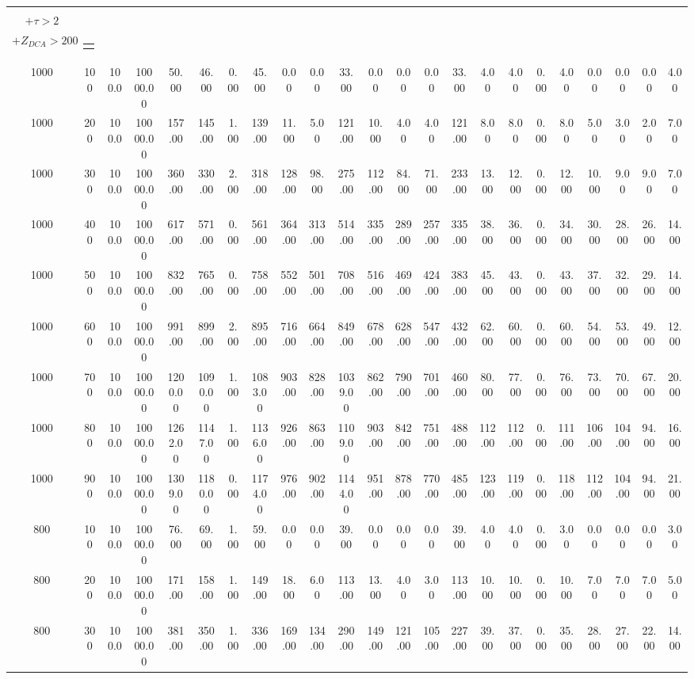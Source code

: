 \documentclass[8pt]{extarticle}
\begin{document}
\begin{longtable}{|c|c|c|c|c|c|c|c|c|c|c|c|c|c|c|c|c|c|c|c|c|c|c|}
\begin{tabular}{@{}c@{}} $E_T^{miss} > 75$ \\ $+ \tau > 2$ \\ $+Z_{DCA} > 200$\end{tabular} & \begin{tabular}{@{}c@{}} $E_{T}^{miss} > 75$ $+ \tau < 4$ \end{tabular} \\ 
\hline 
1000&100&100.0&10000.00&50.00&46.00&0.00&45.00&0.00&0.00&33.00&0.00&0.00&0.00&33.00&4.00&4.00&0.00&4.00&0.00&0.00&0.00&4.00\\ 
\hline 
1000&200&100.0&10000.00&157.00&145.00&1.00&139.00&11.00&5.00&121.00&10.00&4.00&4.00&121.00&8.00&8.00&0.00&8.00&5.00&3.00&2.00&7.00\\ 
\hline 
1000&300&100.0&10000.00&360.00&330.00&2.00&318.00&128.00&98.00&275.00&112.00&84.00&71.00&233.00&13.00&12.00&0.00&12.00&10.00&9.00&9.00&7.00\\ 
\hline 
1000&400&100.0&10000.00&617.00&571.00&0.00&561.00&364.00&313.00&514.00&335.00&289.00&257.00&335.00&38.00&36.00&0.00&34.00&30.00&28.00&26.00&14.00\\ 
\hline 
1000&500&100.0&10000.00&832.00&765.00&0.00&758.00&552.00&501.00&708.00&516.00&469.00&424.00&383.00&45.00&43.00&0.00&43.00&37.00&32.00&29.00&14.00\\ 
\hline 
1000&600&100.0&10000.00&991.00&899.00&2.00&895.00&716.00&664.00&849.00&678.00&628.00&547.00&432.00&62.00&60.00&0.00&60.00&54.00&53.00&49.00&12.00\\ 
\hline 
1000&700&100.0&10000.00&1200.00&1090.00&1.00&1083.00&903.00&828.00&1039.00&862.00&790.00&701.00&460.00&80.00&77.00&0.00&76.00&73.00&70.00&67.00&20.00\\ 
\hline 
1000&800&100.0&10000.00&1262.00&1147.00&1.00&1136.00&926.00&863.00&1109.00&903.00&842.00&751.00&488.00&112.00&112.00&0.00&111.00&106.00&104.00&94.00&16.00\\ 
\hline 
1000&900&100.0&10000.00&1309.00&1180.00&0.00&1174.00&976.00&902.00&1144.00&951.00&878.00&770.00&485.00&123.00&119.00&0.00&118.00&112.00&104.00&94.00&21.00\\ 
\hline 
800&100&100.0&10000.00&76.00&69.00&1.00&59.00&0.00&0.00&39.00&0.00&0.00&0.00&39.00&4.00&4.00&0.00&3.00&0.00&0.00&0.00&3.00\\ 
\hline 
800&200&100.0&10000.00&171.00&158.00&1.00&149.00&18.00&6.00&113.00&13.00&4.00&3.00&113.00&10.00&10.00&0.00&10.00&7.00&7.00&7.00&5.00\\ 
\hline 
800&300&100.0&10000.00&381.00&350.00&1.00&336.00&169.00&134.00&290.00&149.00&121.00&105.00&227.00&39.00&37.00&0.00&35.00&28.00&27.00&22.00&14.00\\ 

\end{longtable}
\end{document}

